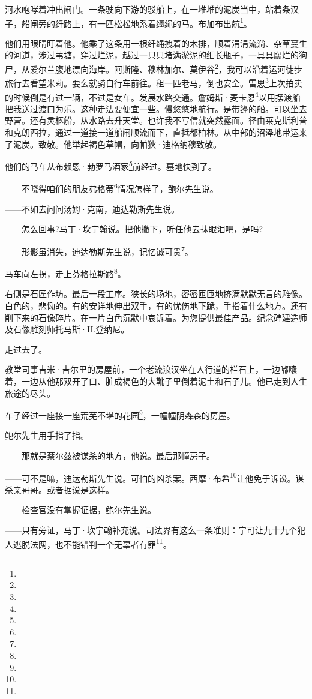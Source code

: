 \par 河水咆哮着冲出闸门。一条驶向下游的驳船上，在一堆堆的泥炭当中，站着条汉子，船闸旁的纤路上，有一匹松松地系着缰绳的马。布加布出航\footnote{}。
\par 他们用眼睛盯着他。他乘了这条用一根纤绳拽着的木排，顺着涓涓流淌、杂草蔓生的河道，涉过苇塘，穿过烂泥，越过一只只堵满淤泥的细长瓶子，一具具腐烂的狗尸，从爱尔兰腹地漂向海岸。阿斯隆、穆林加尔、莫伊谷\footnote{}，我可以沿着运河徒步旅行去看望米莉。要么就骑自行车前往。租一匹老马，倒也安全。雷恩\footnote{}上次拍卖的时候倒是有过一辆，不过是女车。发展水路交通。詹姆斯·麦卡恩\footnote{}以用摆渡船把我送过渡口为乐。这种走法要便宜一些。慢悠悠地航行。是带篷的船。可以坐去野营。还有灵柩船，从水路去升天堂。也许我不写信就突然露面。径由莱克斯利普和克朗西拉，通过一道接一道船闸顺流而下，直抵都柏林。从中部的沼泽地带运来了泥炭。致敬。他举起褐色草帽，向帕狄·迪格纳穆致敬。
\par 他们的马车从布赖恩·勃罗马酒家\footnote{}前经过。墓地快到了。
\par ——不晓得咱们的朋友弗格蒂\footnote{}情况怎样了，鲍尔先生说。
\par ——不如去问问汤姆·克南，迪达勒斯先生说。
\par ——怎么回事?马丁·坎宁翰说。把他撇下，听任他去抹眼泪吧，是吗?
\par ——形影虽消失，迪达勒斯先生说，记忆诚可贵\footnote{}。
\par 马车向左拐，走上芬格拉斯路\footnote{}。
\par 右侧是石匠作坊。最后一段工序。狭长的场地，密密匝匝地挤满默默无言的雕像。白色的，悲恸的。有的安详地伸出双手，有的忧伤地下跪，手指着什么地方。还有削下来的石像碎片。在一片白色沉默中哀诉着。为您提供最佳产品。纪念碑建造师及石像雕刻师托马斯·H.登纳尼。
\par 走过去了。
\par 教堂司事吉米·吉尔里的房屋前，一个老流浪汉坐在人行道的栏石上，一边嘟囔着，一边从他那双开了口、脏成褐色的大靴子里倒着泥土和石子儿。他已走到人生旅途的尽头。
\par 车子经过一座接一座荒芜不堪的花园\footnote{}，一幢幢阴森森的房屋。
\par 鲍尔先生用手指了指。
\par ——那就是蔡尔兹被谋杀的地方，他说。最后那幢房子。
\par ——可不是嘛，迪达勒斯先生说。可怕的凶杀案。西摩·布希\footnote{}让他免于诉讼。谋杀亲哥哥。或者据说是这样。
\par ——检查官没有掌握证据，鲍尔先生说。
\par ——只有旁证，马丁·坎宁翰补充说。司法界有这么一条准则：宁可让九十九个犯人逃脱法网，也不能错判一个无辜者有罪\footnote{}。
